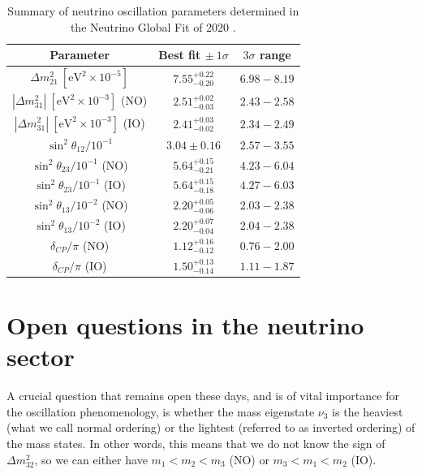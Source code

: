 \begin{table}
	\caption[Summary of neutrino oscillation parameters determined in the Neutrino Global Fit of 2020.]{Summary of neutrino oscillation parameters determined in the Neutrino Global Fit of 2020 \cite{deSalas2020}.}
	\begin{center}
		\begin{small}
			\begin{tabular}{c|c|c}
				Parameter                                               & Best fit $\pm ~ 1\sigma$ & $3 \sigma$ range   \\[1mm] \hline \rule{0pt}{1.1\normalbaselineskip}
				$\Delta m^{2}_{21}~[\mathrm{eV}^{2} \times 10^{-5}]$                   & $7.55^{+0.22}_{-0.20}$ & $6.98-8.19$\\[3mm]
				$\left|\Delta m^{2}_{31}\right|~[\mathrm{eV}^{2}\times 10^{-3}]$ (NO) & $2.51^{+0.02}_{-0.03}$    & $2.43-2.58$\\[2mm]
				$\left|\Delta m^{2}_{31}\right|~[\mathrm{eV}^{2}\times 10^{-3}]$ (IO) & $2.41^{+0.03}_{-0.02}$ & $2.34-2.49$    \\[3mm]
				$\sin^{2} \theta_{12} / 10^{-1}$ & $3.04 \pm 0.16$ & $2.57-3.55$ \\[3mm]
				$\sin^{2} \theta_{23} / 10^{-1}$ (NO) & $5.64^{+0.15}_{-0.21}$ & $4.23-6.04$ \\[2mm]
				$\sin^{2} \theta_{23} / 10^{-1}$ (IO) & $5.64^{+0.15}_{-0.18}$ & $4.27-6.03$ \\[3mm]
				$\sin^{2} \theta_{13} / 10^{-2}$ (NO) & $2.20^{+0.05}_{-0.06}$ & $2.03-2.38$ \\[2mm]
				$\sin^{2} \theta_{13} / 10^{-2}$ (IO) & $2.20^{+0.07}_{-0.04}$ & $2.04-2.38$ \\[3mm]
				$\delta_{CP} / \pi$ (NO) & $1.12^{+0.16}_{-0.12}$ & $0.76-2.00$ \\[2mm]
				$\delta_{CP} / \pi$ (IO) & $1.50^{+0.13}_{-0.14}$ & $1.11-1.87$
			\end{tabular}
		\end{small}
	\end{center}
	\label{tab:neutrino_global_fit}
\end{table}

\section{Open questions in the neutrino sector}\label{sec:nu_open_questions}

A crucial question that remains open these days, and is of vital importance for the oscillation phenomenology, is whether the mass eigenstate $\nu_{3}$ is the heaviest (what we call normal ordering) or the lightest (referred to as inverted ordering) of the mass states. In other words, this means that we do not know the sign of $\Delta m^{2}_{32}$, so we can either have $m_{1}<m_{2}<m_{3}$ (NO) or $m_{3}<m_{1}<m_{2}$ (IO).

